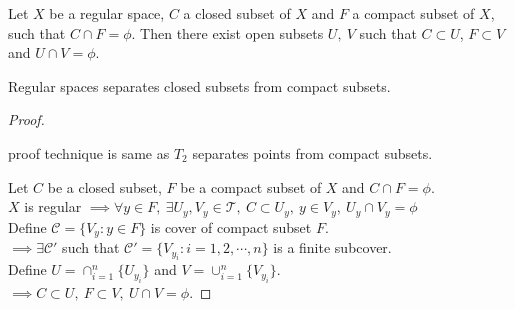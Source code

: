 \begin{proposition}
	Let $X$ be a regular space, $C$ a closed subset of $X$ and $F$ a compact subset of $X$, such that $C \cap F = \phi$.
	Then there exist open subsets $U,\ V$ such that $C \subset U$, $F \subset V$ and $U \cap V = \phi$.
\end{proposition}
\begin{commentary}
	Regular spaces separates closed subsets from compact subsets.
\end{commentary}
\begin{proof}
\begin{commentary}
	proof technique is same as $T_2$ separates points from compact subsets.
\end{commentary}
	Let $C$ be a closed subset, $F$ be a compact subset of $X$ and $C \cap F = \phi$.\\
	$X$ is regular $\implies \forall y \in F,\ \exists U_y,V_y \in \mathcal{T},\ C \subset U_y,\ y \in V_y,\ U_y \cap V_y = \phi$\\
	Define $\mathcal{C} = \{ V_y : y \in F \}$ is cover of compact subset $F$.\\
	$\implies \exists \mathcal{C}'$ such that $\mathcal{C}' = \{ V_{y_i} : i = 1,2,\cdots,n \}$ is a finite subcover.\\
	Define $U = \cap_{i = 1}^n \{ U_{y_i} \}$ and $V = \cup_{i = 1}^n \{ V_{y_i} \}$.\\
	$\implies C \subset U,\ F \subset V,\ U \cap V = \phi$.
\end{proof}

